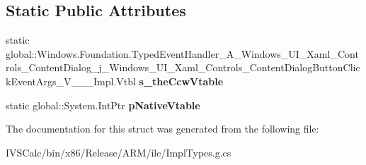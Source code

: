 \subsection*{Static Public Attributes}
\begin{DoxyCompactItemize}
\item 
\mbox{\label{struct_windows_1_1_foundation_1_1_typed_event_handler___a___windows___u_i___xaml___controls___co8b92684606b505f49919e89761d7b36c_aafc9c5f49cb6a86ac5e06395ecea65a2}} 
static global\+::\+Windows.\+Foundation.\+Typed\+Event\+Handler\+\_\+\+A\+\_\+\+Windows\+\_\+\+U\+I\+\_\+\+Xaml\+\_\+\+Controls\+\_\+\+Content\+Dialog\+\_\+j\+\_\+\+Windows\+\_\+\+U\+I\+\_\+\+Xaml\+\_\+\+Controls\+\_\+\+Content\+Dialog\+Button\+Click\+Event\+Args\+\_\+\+V\+\_\+\+\_\+\+\_\+\+Impl.\+Vtbl {\bfseries s\+\_\+the\+Ccw\+Vtable}
\item 
\mbox{\label{struct_windows_1_1_foundation_1_1_typed_event_handler___a___windows___u_i___xaml___controls___co8b92684606b505f49919e89761d7b36c_a137eb1c3aa5adc2f8d7f32380b1ff456}} 
static global\+::\+System.\+Int\+Ptr {\bfseries p\+Native\+Vtable}
\end{DoxyCompactItemize}


The documentation for this struct was generated from the following file\+:\begin{DoxyCompactItemize}
\item 
I\+V\+S\+Calc/bin/x86/\+Release/\+A\+R\+M/ilc/Impl\+Types.\+g.\+cs\end{DoxyCompactItemize}
